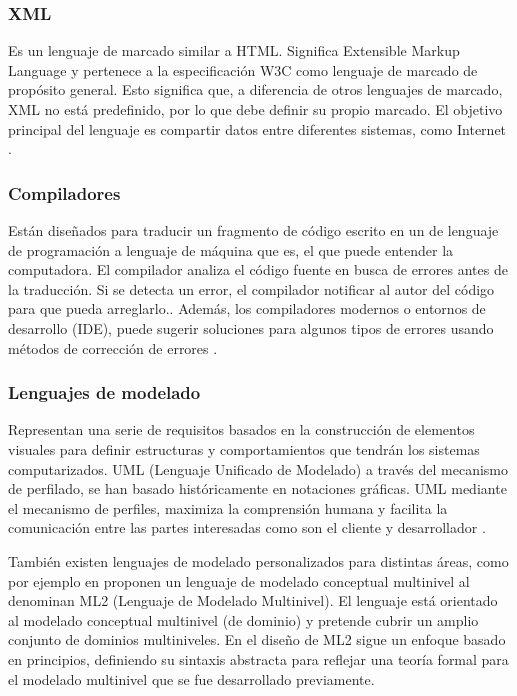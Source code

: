 \documentclass[12pt,a4paper,final]{article}
\begin{document}
    \subsubsection{XML}
    
    Es un lenguaje de marcado similar a HTML. Significa Extensible Markup Language y pertenece a la especificación W3C como lenguaje de marcado de propósito general. Esto significa que, a diferencia de otros lenguajes de marcado, XML no está predefinido, por lo que debe definir su propio marcado. El objetivo principal del lenguaje es compartir datos entre diferentes sistemas, como Internet \cite{XML-based}.
    
    \subsubsection{Compiladores}
    Están diseñados para traducir un fragmento de código escrito en un de lenguaje de programación a lenguaje de máquina que es, el que puede entender la computadora. El compilador analiza el código fuente en busca de errores antes de la traducción. Si se detecta un error, el compilador
    notificar al autor del código para que pueda arreglarlo.. Además, los compiladores modernos o entornos de desarrollo (IDE), puede sugerir soluciones para algunos tipos de errores usando métodos de corrección de errores \cite{CoEdit}.
    
    \subsubsection{Lenguajes de modelado}
    Representan una serie de requisitos basados en la construcción de elementos visuales para definir estructuras y comportamientos que tendrán los sistemas computarizados. UML (Lenguaje Unificado de Modelado) a través del mecanismo de perfilado, se han basado históricamente en notaciones gráficas. UML mediante el mecanismo de perfiles, maximiza la comprensión humana y facilita la comunicación entre las partes interesadas como son el cliente y desarrollador \cite{Blended}. 
    
    También existen lenguajes de modelado personalizados para distintas áreas, como por ejemplo en \cite{Multi-level} proponen un lenguaje de modelado conceptual multinivel al denominan ML2 (Lenguaje de Modelado Multinivel). El lenguaje está orientado al modelado conceptual multinivel (de dominio) y pretende cubrir un amplio conjunto de dominios multiniveles. En el diseño de ML2 sigue un enfoque basado en principios, definiendo su sintaxis abstracta para reflejar una teoría formal para el modelado multinivel que se fue desarrollado previamente.
	
\end{document}

